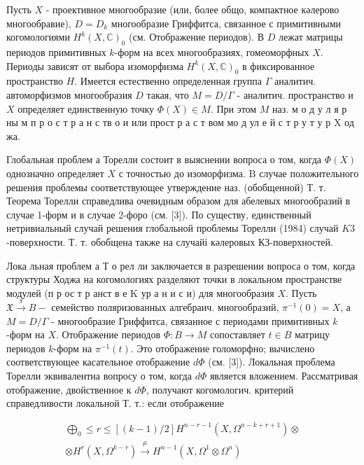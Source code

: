 \documentclass[10pt]{article}
\begin{document}
Пусть $X$ - проективное многообразие (или, более общо, компактное кәлерово многообравие), $D=D_{k}$ многообразие Гриффитса, связанное с примитивными когомологиями $H^{k}(X, \mathbb{C})_{0}$ (см. Отображение периодов). В $D$ лежат матрицы периодов примитивных $k$-форм на всех многообразиях, гомеоморфных $X$. Периоды зависят от выбора изоморфизма $H^{k}(X, \mathbb{C})_{0}$ в фиксированное пространство $H$. Имеется естественно определенная группа $\Gamma$ аналитич. автоморфизмов многообразия $D$ такая, что $M=D / \Gamma$ - аналитич. пространство и $X$ определяет единственную точку $\Phi(X) \in M$. При этом $M$ наз. м о д у л я р ны м п р о с т р а н с тв о и или прост р а с т вом мо д ул е й с т р у т у р $\mathrm{X}$ од жа.



Глобальная проблем а Торелли состоит в выяснении вопроса о том, когда $\Phi(X)$ однозначно определяет $X$ с точностью до изоморфизма. $\mathrm{B}$ случае положительного решения проблемы соответствующее утверждение наз. (обобщенной) Т. т. Теорема Торелли справедлива очевидным образом для абелевых многообразий в случае 1-форм и в случае 2-форо (см. [3]). По существу, единственный нетривиальный случай решения глобальной проблемы Торелли (1984) случай $K 3$-поверхности. Т. т. обобщена также на случайі кәлеровых КЗ-поверхностей.



Лока льная проблем а Т о рел ли заключается в разрешении вопроса о том, когда структуры Ходжа на когомологиях разделяют точки в локальном пространстве модулей (п р ос т р анст в е $\mathrm{K}$ ур а н и с и) для многообразия $X$. Пусть $\mathfrak{X} \stackrel{\pi}{\rightarrow} B-$ семейство поляризованных алгебраич. многообразий, $\pi^{-1}(0)=X$, а $M=D / \Gamma$ - многообразие Гриффитса, связанное с периодами примитивных $k$-форм на $X$. Отображение периодов $\Phi: B \rightarrow M$ сопоставляет $t \in B$ матрицу периодов $k$-форм на $\pi^{-1}(t)$. Это отображение голоморфно; вычислено соответствующее касательное отображение $d \Phi$ (см. [3]). Локальная проблема Торелли эквивалентна вопросу о том, когда $d \Phi$ является вложением. Рассматривая отображение, двойственное к $d \Phi$, получают когомологич. критерий справедливости локальной Т. т.: если отображение



\[

\begin{gathered}

\bigoplus_{0} \leqslant r \leqslant[(k-1) / 2] H^{n-r-1}\left(X, \Omega^{n-k+r+1}\right) \otimes \\

\otimes H^{r}\left(X, \Omega^{k-r}\right) \stackrel{\mu}{\rightarrow} H^{n-1}\left(X, \Omega^{1} \otimes \Omega^{n}\right)

\end{gathered}

\]
\end{document}
